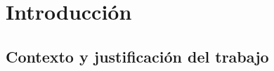 \documentclass[IB,BIB]{TFUOC}%
\begin{document}


\chapter{Introducción}
\label{chap:Introducción}


\section{Contexto y justificación del trabajo}
\label{sec:Contexto y justificación del trabajo}



%
%
%
%
%
%
%
\end{document}
